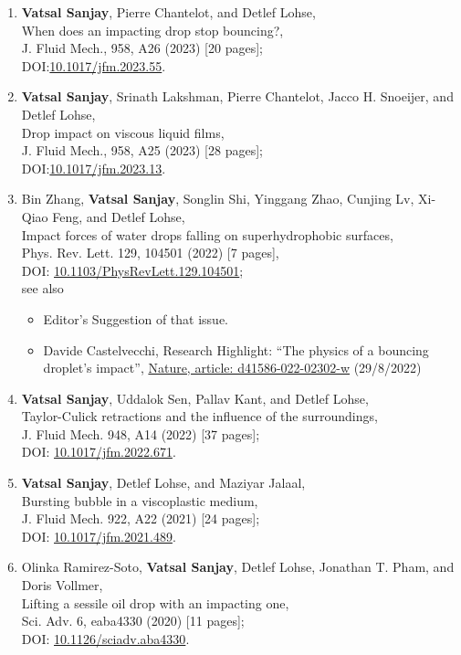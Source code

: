 \documentclass[11pt,a4paper,roman,english,colorlinks,linkcolor=true]{moderncv}
\begin{document}
\begin{enumerate}[leftmargin=2.5cm]
	\item \textbf{Vatsal Sanjay}, Pierre Chantelot, and Detlef Lohse,\\
	When does an impacting drop stop bouncing?,\\
	J. Fluid Mech., 958, A26 (2023) [20 pages];\\
	DOI:\href{https://doi.org/10.1017/jfm.2023.55}{10.1017/jfm.2023.55}.
	
	\item \textbf{Vatsal Sanjay}, Srinath Lakshman, Pierre Chantelot, Jacco H. Snoeijer, and Detlef Lohse,\\
	Drop impact on viscous liquid films,\\
	J. Fluid Mech., 958, A25 (2023) [28 pages];\\
	DOI:\href{https://doi.org/10.1017/jfm.2023.13}{10.1017/jfm.2023.13}.	
	
	\item Bin Zhang, \textbf{Vatsal Sanjay}, Songlin Shi,  Yinggang Zhao,  Cunjing Lv,  Xi-Qiao Feng,  and Detlef Lohse,\\
	Impact forces of water drops falling on superhydrophobic surfaces,\\
	Phys. Rev. Lett. 129, 104501 (2022) [7 pages],\\
	DOI: \href{https://doi.org/10.1103/PhysRevLett.129.104501}{10.1103/PhysRevLett.129.104501};\\
	see also
	\begin{itemize}
		\item
		Editor's Suggestion of that issue. 
		\item
		Davide Castelvecchi, Research Highlight: ``The physics of a bouncing droplet's impact'', \href{https://www.nature.com/articles/d41586-022-02302-w}{Nature, article: d41586-022-02302-w} (29/8/2022)
	\end{itemize}
	\item \textbf{Vatsal Sanjay}, Uddalok Sen, Pallav Kant, and Detlef Lohse,\\
	Taylor-Culick retractions and the influence of the surroundings,\\
	J. Fluid Mech. 948, A14  (2022) [37 pages];\\
	DOI: \href{https://doi.org/10.1017/jfm.2022.671}{10.1017/jfm.2022.671}.
	\item \textbf{Vatsal Sanjay}, Detlef Lohse, and Maziyar Jalaal,\\
	Bursting bubble in a viscoplastic medium,\\
	J. Fluid Mech. 922, A22  (2021) [24 pages];\\
	DOI: \href{https://doi.org/10.1017/jfm.2021.489}{10.1017/jfm.2021.489}.
	\item Olinka Ramirez-Soto, \textbf{Vatsal Sanjay},  Detlef Lohse,  Jonathan T. Pham, and Doris Vollmer,\\
	Lifting a sessile oil drop with an impacting one,\\
	Sci. Adv. 6, eaba4330  (2020) [11 pages];\\
	DOI: \href{https://doi.org/10.1126/sciadv.aba4330}{10.1126/sciadv.aba4330}.	
	

\end{enumerate}
\end{document}
